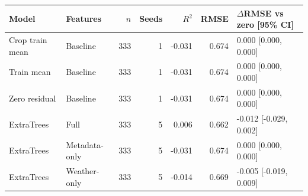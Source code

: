 \begin{tabular}{llrrrrl}
\toprule
Model & Features & $n$ & Seeds & $R^2$ & RMSE & $\Delta$RMSE vs zero [95\% CI] \\
\midrule
Crop train mean & Baseline & 333 & 1 & -0.031 & 0.674 & 0.000 [0.000, 0.000] \\
Train mean & Baseline & 333 & 1 & -0.031 & 0.674 & 0.000 [0.000, 0.000] \\
Zero residual & Baseline & 333 & 1 & -0.031 & 0.674 & 0.000 [0.000, 0.000] \\
ExtraTrees & Full & 333 & 5 & 0.006 & 0.662 & -0.012 [-0.029, 0.002] \\
ExtraTrees & Metadata-only & 333 & 5 & -0.031 & 0.674 & 0.000 [0.000, 0.000] \\
ExtraTrees & Weather-only & 333 & 5 & -0.014 & 0.669 & -0.005 [-0.019, 0.009] \\
\bottomrule
\end{tabular}
